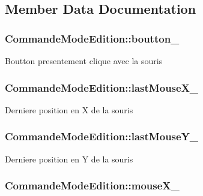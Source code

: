 \subsection{Member Data Documentation}
\hypertarget{class_commande_mode_edition_a84e2d980201bc0649b2af9c9f4bff7e6}{
\subsubsection[{boutton\-\_\-}]{ Commande\-Mode\-Edition\-::boutton\-\_\-\hspace{0.3cm}{\ttfamily [protected]}}}\label{class_commande_mode_edition_a84e2d980201bc0649b2af9c9f4bff7e6}
Boutton presentement clique avec la souris \hypertarget{class_commande_mode_edition_a02fd21f564101674d5c8af535322ea02}{
\subsubsection[{last\-Mouse\-X\-\_\-}]{ Commande\-Mode\-Edition\-::last\-Mouse\-X\-\_\-\hspace{0.3cm}{\ttfamily [protected]}}}\label{class_commande_mode_edition_a02fd21f564101674d5c8af535322ea02}
Derniere position en X de la souris \hypertarget{class_commande_mode_edition_a42bd29db98adec623e8c7cd5771783f3}{
\subsubsection[{last\-Mouse\-Y\-\_\-}]{ Commande\-Mode\-Edition\-::last\-Mouse\-Y\-\_\-\hspace{0.3cm}{\ttfamily [protected]}}}\label{class_commande_mode_edition_a42bd29db98adec623e8c7cd5771783f3}
Derniere position en Y de la souris \hypertarget{class_commande_mode_edition_ade7653be98ae5dd9da895a34983ec680}{
\subsubsection[{mouse\-X\-\_\-}]{ Commande\-Mode\-Edition\-::mouse\-X\-\_\-\hspace{0.3cm}{\ttfamily [protected]}}}\label{class_commande_mode_edition_ade7653be98ae5dd9da895a34983ec680}
